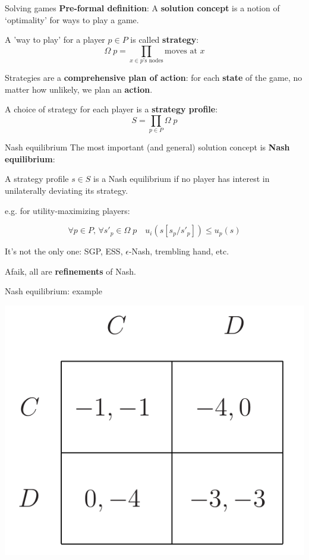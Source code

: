 \begin{frame}{Solving games}
	\textbf{Pre-formal definition}: A \textbf{solution concept} is a notion of `optimality' for ways to play a game.

	\vfill
	A 'way to play' for a player $p \in P$ is called \textbf{strategy}:
	\begin{equation*}
		\Omega\; p = \prod_{x \in \text{$p$'s nodes}} \text{moves at $x$}
	\end{equation*}

	Strategies are a \textbf{comprehensive plan of action}: for each \textbf{state} of the game, no matter how unlikely, we plan an \textbf{action}.

	\vfill
	A choice of strategy for each player is a \textbf{strategy profile}:
	\begin{equation*}
		S = \prod_{p \in P} \Omega\; p
	\end{equation*}
\end{frame}

\begin{frame}{Nash equilibrium}
	The most important (and general) solution concept is \textbf{Nash equilibrium}:

	\vfill
	\begin{definition}
		A strategy profile $s \in S$ is a Nash equilibrium if no player has interest in unilaterally deviating its strategy.
	\end{definition}

	\vfill
	e.g. for utility-maximizing players:

	\begin{equation*}
		\forall p \in P,\, \forall s'_p \in \Omega\; p \quad u_i(s[s_p/s'_p]) \leq u_p(s)
	\end{equation*}

	\vfill
	It's not the only one: SGP, ESS, $\epsilon$-Nash, trembling hand, etc.

	Afaik, all are \textbf{refinements} of Nash.
\end{frame}

\begin{frame}{Nash equilibrium: example}
	\begin{center}
		\includegraphics[width=.6\textwidth]{figures/pd_norm.png}
	\end{center}
\end{frame}

